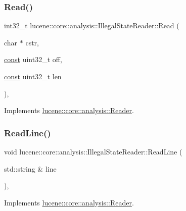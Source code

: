 \subsubsection{\texorpdfstring{Read()}{Read()}\hspace{0.1cm}{\footnotesize\ttfamily [2/2]}}
{\footnotesize\ttfamily int32\+\_\+t lucene\+::core\+::analysis\+::\+Illegal\+State\+Reader\+::\+Read (\begin{DoxyParamCaption}\item[{char $\ast$}]{cstr,  }\item[{\mbox{\hyperlink{ZlibCrc32_8h_a2c212835823e3c54a8ab6d95c652660e}{const}} uint32\+\_\+t}]{off,  }\item[{\mbox{\hyperlink{ZlibCrc32_8h_a2c212835823e3c54a8ab6d95c652660e}{const}} uint32\+\_\+t}]{len }\end{DoxyParamCaption})\hspace{0.3cm}{\ttfamily [inline]}, {\ttfamily [virtual]}}



Implements \mbox{\hyperlink{classlucene_1_1core_1_1analysis_1_1Reader_a986e25a49a947dc113a22c6de033ebe9}{lucene\+::core\+::analysis\+::\+Reader}}.

\mbox{\label{classlucene_1_1core_1_1analysis_1_1IllegalStateReader_a39217e818ee6678830260a10885400f8}} 
\subsubsection{\texorpdfstring{Read\+Line()}{ReadLine()}}
{\footnotesize\ttfamily void lucene\+::core\+::analysis\+::\+Illegal\+State\+Reader\+::\+Read\+Line (\begin{DoxyParamCaption}\item[{std\+::string \&}]{line }\end{DoxyParamCaption})\hspace{0.3cm}{\ttfamily [inline]}, {\ttfamily [virtual]}}



Implements \mbox{\hyperlink{classlucene_1_1core_1_1analysis_1_1Reader_a475ba046fd74e43a1cce4c4702c791c2}{lucene\+::core\+::analysis\+::\+Reader}}.

